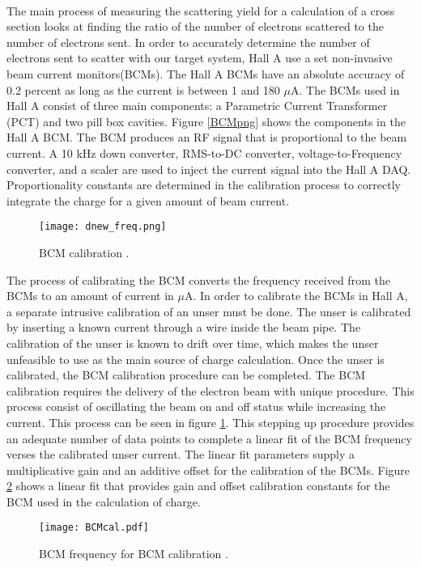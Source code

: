 	\paragraph{} The main process of measuring the scattering yield for a calculation of a cross section looks at finding the ratio of the number of electrons scattered to the number of electrons sent. In order to accurately determine the number of electrons sent to scatter with our target system, Hall A use a set non-invasive beam current monitors(BCMs). The Hall A BCMs have an absolute accuracy of 0.2 percent as long as the current is between 1 and 180 $\mu$A. The BCMs used in Hall A consist of three main components: a Parametric Current Transformer (PCT) and two pill box cavities. Figure \ref{BCMpng} shows the components in the Hall A BCM.  The BCM produces an RF signal that is proportional to the beam current. A 10 kHz down converter, RMS-to-DC converter, voltage-to-Frequency converter, and a scaler are used to inject the current signal into the Hall A DAQ. Proportionality constants are determined in the calibration process to correctly integrate the charge for a given amount of beam current\cite{BCM1}.
	\begin{figure}[h]
		\centering
		\texttt{[image: dnew\_freq.png]}
		\caption{BCM calibration \cite{MikeTh}.
		\label{dnewfreq}}
	\end{figure}
	The process of calibrating the BCM converts the frequency received from the BCMs to an amount of current in $\mu$A. In order to calibrate the BCMs in Hall A, a separate intrusive calibration of an unser must be done. The unser is calibrated by inserting a known current through a wire inside the beam pipe. The calibration of the unser is known to drift over time, which makes the unser unfeasible to use as the main source of charge calculation. Once the unser is calibrated, the BCM calibration procedure can be completed. The BCM calibration requires the delivery of the electron beam with unique procedure. This process consist of oscillating the beam on and off status while increasing the current. This process can be seen in figure \ref{dnewfreq}. This stepping up procedure provides an adequate number of data points to complete a linear fit of the BCM frequency verses the calibrated unser current. The linear fit parameters supply a multiplicative gain and an additive offset for the calibration of the BCMs. Figure \ref{bcmcal} shows a linear fit that provides gain and offset calibration constants for the BCM used in the calculation of charge. 
	\begin{figure}[h]
		\centering
		\texttt{[image: BCMcal.pdf]}
		\caption{BCM frequency for BCM calibration \cite{MikeTh}.
			\label{bcmcal}}
	\end{figure}	
	  
